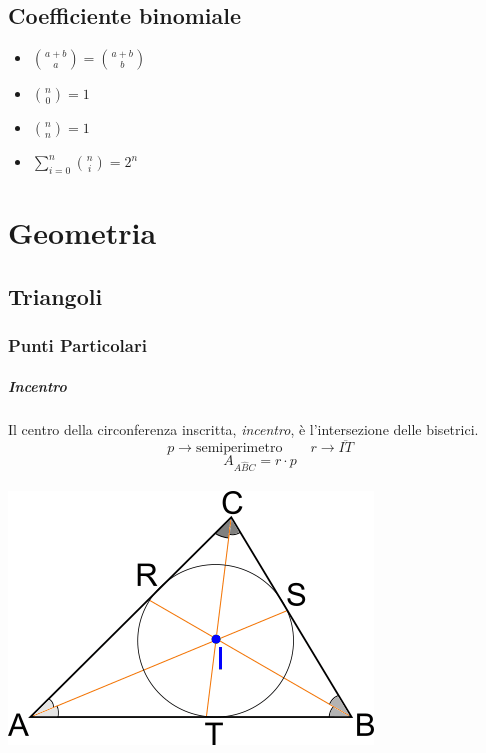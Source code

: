 \documentclass[12pt, a4paper,oneside]{report}
\begin{document}
	\section{Coefficiente binomiale}
	\begin{itemize}
		\item {\LARGE$\binom{a+b}{a}=\binom{a+b}{b}$}
		\item {\LARGE$\binom{n}{0}=1$}
		\item {\LARGE$\binom{n}{n}=1$}
		\item {\LARGE$\sum_{i=0}^{n}\binom{n}{i}=2^n$}
	\end{itemize}
\chapter{Geometria}
	\newtheorem*{euclide1}{I Teorema di Euclide}
	\newtheorem*{euclide2}{II Teorema di Euclide}
	\newtheorem*{pitagora}{Teorema di Pitagora}
	\section{Triangoli}
	\subsection{Punti Particolari}
	\paragraph{Incentro}
	Il centro della circonferenza inscritta, \textit{incentro}, è l'intersezione delle bisetrici.
	\[
	p\to\text{semiperimetro}\qquad r\to\overline{IT}
	\]
	\[
	A_{A\hat{B}C}=r\cdot p
	\]
	\\
	\includegraphics{In.jpg}
	\vspace{10cm}
\end{document}
